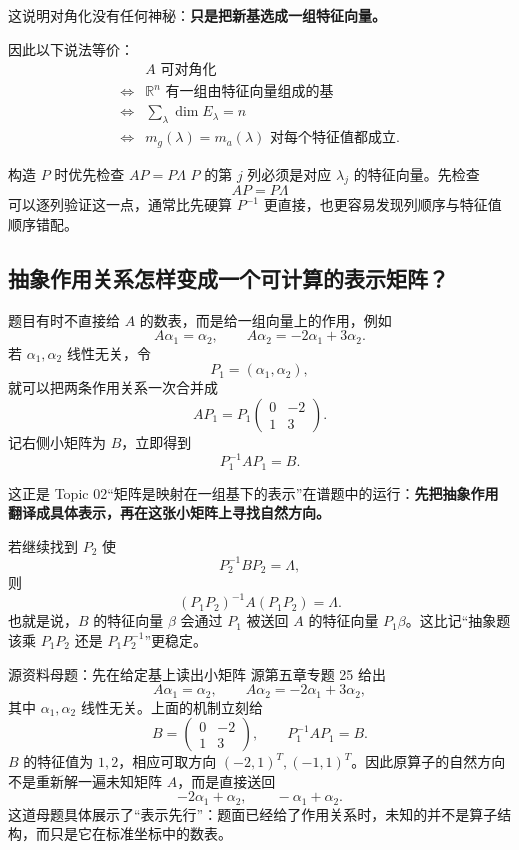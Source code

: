 \documentclass[11pt,a4paper]{ctexart}
\newcommand{\kw}[1]{\textbf{\color{deep}#1}}
\begin{document}
这说明对角化没有任何神秘：\kw{只是把新基选成一组特征向量。}

因此以下说法等价：
\[
\boxed{
\begin{aligned}
&A\text{ 可对角化}\\
\Longleftrightarrow{}&\mathbb R^n\text{ 有一组由特征向量组成的基}\\
\Longleftrightarrow{}&\sum_{\lambda}\dim E_\lambda=n\\
\Longleftrightarrow{}&m_g(\lambda)=m_a(\lambda)\text{ 对每个特征值都成立}.
\end{aligned}}
\]

\begin{methodbox}{构造 $P$ 时优先检查 $AP=P\Lambda$}
$P$ 的第 $j$ 列必须是对应 $\lambda_j$ 的特征向量。先检查
\[
AP=P\Lambda
\]
可以逐列验证这一点，通常比先硬算 $P^{-1}$ 更直接，也更容易发现列顺序与特征值顺序错配。
\end{methodbox}

\subsection{抽象作用关系怎样变成一个可计算的表示矩阵？}

题目有时不直接给 $A$ 的数表，而是给一组向量上的作用，例如
\[
A\alpha_1=\alpha_2,
\qquad
A\alpha_2=-2\alpha_1+3\alpha_2.
\]
若 $\alpha_1,\alpha_2$ 线性无关，令
\[
P_1=(\alpha_1,\alpha_2),
\]
就可以把两条作用关系一次合并成
\[
A P_1=P_1
\begin{pmatrix}
0&-2\\
1&3
\end{pmatrix}.
\]
记右侧小矩阵为 $B$，立即得到
\[
\boxed{P_1^{-1}AP_1=B.}
\]

这正是 Topic 02“矩阵是映射在一组基下的表示”在谱题中的运行：\kw{先把抽象作用翻译成具体表示，再在这张小矩阵上寻找自然方向。}

若继续找到 $P_2$ 使
\[
P_2^{-1}BP_2=\Lambda,
\]
则
\[
\boxed{(P_1P_2)^{-1}A(P_1P_2)=\Lambda.}
\]
也就是说，$B$ 的特征向量 $\beta$ 会通过 $P_1$ 被送回 $A$ 的特征向量 $P_1\beta$。这比记“抽象题该乘 $P_1P_2$ 还是 $P_1P_2^{-1}$”更稳定。

\begin{examplebox}{源资料母题：先在给定基上读出小矩阵}
源第五章专题 25 给出
\[
A\alpha_1=\alpha_2,
\qquad
A\alpha_2=-2\alpha_1+3\alpha_2,
\]
其中 $\alpha_1,\alpha_2$ 线性无关。上面的机制立刻给
\[
B=\begin{pmatrix}0&-2\\1&3\end{pmatrix},
\qquad
P_1^{-1}AP_1=B.
\]
$B$ 的特征值为 $1,2$，相应可取方向 $(-2,1)^T,(-1,1)^T$。因此原算子的自然方向不是重新解一遍未知矩阵 $A$，而是直接送回
\[
-2\alpha_1+\alpha_2,
\qquad
-\alpha_1+\alpha_2.
\]
这道母题具体展示了“表示先行”：题面已经给了作用关系时，未知的并不是算子结构，而只是它在标准坐标中的数表。
\end{examplebox}
\end{document}
